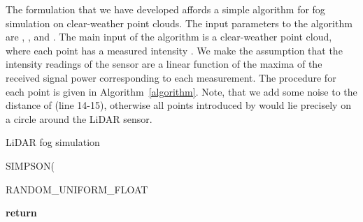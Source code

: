 \documentclass[10pt,twocolumn,letterpaper]{article}
\begin{document}
The formulation that we have developed affords a simple algorithm for fog simulation on clear-weather point clouds. The input parameters to the algorithm are , ,  and . The main input of the algorithm is a clear-weather point cloud, where each point  has a measured intensity . We make the assumption that the intensity readings of the sensor are a linear function of the maxima of the received signal power  corresponding to each measurement. The procedure for each point  is given in Algorithm~\ref{algorithm}. Note, that we add some noise to the distance of  (line 14-15), otherwise all points introduced by  would lie precisely on a circle around the LiDAR sensor.




\begin{algorithm}
  \caption{LiDAR fog simulation}\label{algorithm}
  \begin{algorithmic}[1]
      \State 
      \State                                               \scriptsize \Comment{} \normalsize
      \State                                    \scriptsize {} \normalsize
      
      \State                        \scriptsize {} \normalsize
      
                                                       \scriptsize {} \normalsize
        \State  \scriptsize SIMPSON\normalsize(    \scriptsize {} \normalsize
      \EndFor
      
      \State 
      \State 
      
      \State               \scriptsize {} \normalsize
      
      \If{}
        \State                                      \scriptsize {} \normalsize
        \State  \scriptsize RANDOM\_UNIFORM\_FLOAT\normalsize                    
        \State                                                             \scriptsize {} \normalsize
        \State 
        \State 
        \State 
        \State 
      \Else                                                                             \scriptsize {} \normalsize
        \State                                                 \scriptsize {} \normalsize
      \EndIf
      
      \State \textbf{return}                                                \EndProcedure
  \end{algorithmic}
\end{algorithm}
\end{document}
